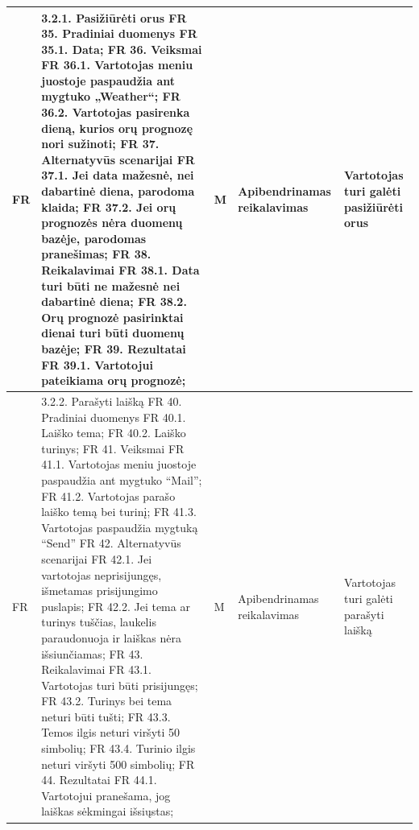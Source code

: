 \documentclass[oneside]{VUMIFPSkursinis}
\begin{document}
\begin{longtable}{ | p{}|p{}|p{}|p{}|p{}| }
	FR & 3.2.1. Pasižiūrėti orus
FR 35. Pradiniai duomenys
FR 35.1. Data;
FR 36. Veiksmai
FR 36.1. Vartotojas meniu juostoje paspaudžia ant mygtuko „Weather“;
FR 36.2. Vartotojas pasirenka dieną, kurios orų prognozę nori sužinoti;
FR 37. Alternatyvūs scenarijai
FR 37.1. Jei data mažesnė, nei dabartinė diena, parodoma klaida;
FR 37.2. Jei orų prognozės nėra duomenų bazėje, parodomas pranešimas;
FR 38. Reikalavimai
FR 38.1. Data turi būti ne mažesnė nei dabartinė diena;
FR 38.2. Orų prognozė pasirinktai dienai turi būti duomenų bazėje;
FR 39. Rezultatai
FR 39.1. Vartotojui pateikiama orų prognozė; & M & Apibendrinamas reikalavimas & Vartotojas turi galėti pasižiūrėti orus\\ \hline
	FR & 3.2.2. Parašyti laišką
FR 40. Pradiniai duomenys
FR 40.1. Laiško tema;
FR 40.2. Laiško turinys;
FR 41. Veiksmai
FR 41.1. Vartotojas meniu juostoje paspaudžia ant mygtuko “Mail”;
FR 41.2. Vartotojas parašo laiško temą bei turinį;
FR 41.3. Vartotojas paspaudžia mygtuką “Send”
FR 42. Alternatyvūs scenarijai
FR 42.1. Jei vartotojas neprisijungęs, išmetamas prisijungimo puslapis;
FR 42.2. Jei tema ar turinys tuščias, laukelis paraudonuoja ir laiškas nėra išsiunčiamas;
FR 43. Reikalavimai
FR 43.1. Vartotojas turi būti prisijungęs;
FR 43.2. Turinys bei tema neturi būti tušti;
FR 43.3. Temos ilgis neturi viršyti 50 simbolių;
FR 43.4. Turinio ilgis neturi viršyti 500 simbolių;
FR 44. Rezultatai
FR 44.1. Vartotojui pranešama, jog laiškas sėkmingai išsiųstas; & M & Apibendrinamas reikalavimas & Vartotojas turi galėti parašyti laišką \\ \hline


\end{longtable}
\end{document}
